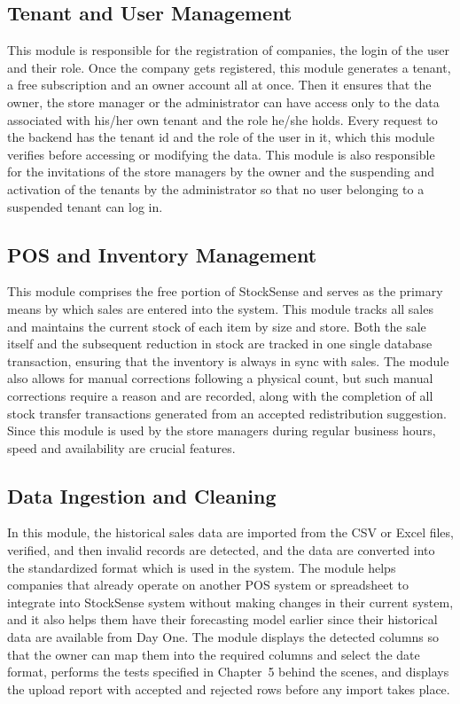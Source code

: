 \documentclass{StockSense}
\begin{document}
\subsection{Tenant and User Management}

This module is responsible for the registration of companies, the login of the user and their role. Once the company gets registered, this module generates a tenant, a free subscription and an owner account all at once. Then it ensures that the owner, the store manager or the administrator can have access only to the data associated with his/her own tenant and the role he/she holds. Every request to the backend has the tenant id and the role of the user in it, which this module verifies before accessing or modifying the data. This module is also responsible for the invitations of the store managers by the owner and the suspending and activation of the tenants by the administrator so that no user belonging to a suspended tenant can log in.

\subsection{POS and Inventory Management}

This module comprises the free portion of StockSense and serves as the primary means by which sales are entered into the system. This module tracks all sales and maintains the current stock of each item by size and store. Both the sale itself and the subsequent reduction in stock are tracked in one single database transaction, ensuring that the inventory is always in sync with sales. The module also allows for manual corrections following a physical count, but such manual corrections require a reason and are recorded, along with the completion of all stock transfer transactions generated from an accepted redistribution suggestion. Since this module is used by the store managers during regular business hours, speed and availability are crucial features.

\subsection{Data Ingestion and Cleaning}

In this module, the historical sales data are imported from the CSV or Excel files, verified, and then invalid records are detected, and the data are converted into the standardized format which is used in the system. The module helps companies that already operate on another POS system or spreadsheet to integrate into StockSense system without making changes in their current system, and it also helps them have their forecasting model earlier since their historical data are available from Day One. The module displays the detected columns so that the owner can map them into the required columns and select the date format, performs the tests specified in Chapter~5 behind the scenes, and displays the upload report with accepted and rejected rows before any import takes place.
\end{document}
